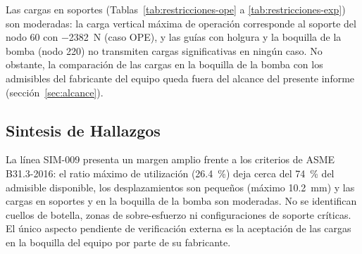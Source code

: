 Las cargas en soportes (Tablas~\ref{tab:restricciones-ope} a
\ref{tab:restricciones-exp}) son moderadas: la carga vertical m\'{a}xima de
operaci\'{o}n corresponde al soporte del nodo 60 con
\num{-2382}~\si{N} (caso OPE), y las gu\'{i}as con holgura y la boquilla de la
bomba (nodo 220) no transmiten cargas significativas en ning\'{u}n caso. No
obstante, la comparaci\'{o}n de las cargas en la boquilla de la bomba con los
admisibles del fabricante del equipo queda fuera del alcance del presente
informe (secci\'{o}n~\ref{sec:alcance}).

\subsection{Sintesis de Hallazgos}

La l\'{i}nea SIM-009 presenta un margen amplio frente a los criterios de
ASME B31.3-2016: el ratio m\'{a}ximo de utilizaci\'{o}n (26.4~\%) deja cerca
del 74~\% del admisible disponible, los desplazamientos son peque\~{n}os
(m\'{a}ximo 10.2~\si{mm}) y las cargas en soportes y en la boquilla de la bomba
son moderadas. No se identifican cuellos de
botella, zonas de sobre-esfuerzo ni configuraciones de soporte cr\'{i}ticas.
El \'{u}nico aspecto pendiente de verificaci\'{o}n externa es la aceptaci\'{o}n
de las cargas en la boquilla del equipo por parte de su fabricante.
